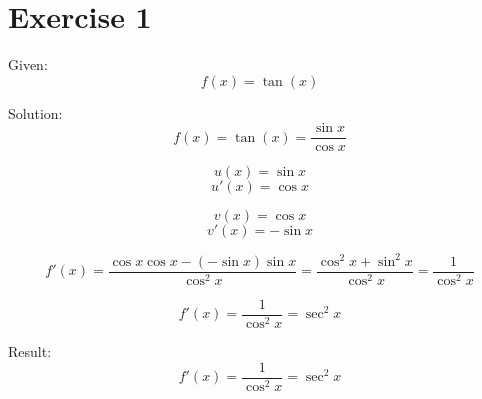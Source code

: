 \documentclass[a4paper, 10pt]{scrartcl}
\begin{document}
\section{Exercise 1}

Given:
\[f(x) = \tan(x)\]

Solution:
\[f(x) = \tan(x) = \frac{\sin{x}}{\cos{x}}\]

\[u(x) = \sin{x}\]
\[u'(x) = \cos{x}\]

\[v(x) = \cos{x}\]
\[v'(x) = -\sin{x}\]

\[f'(x) = \frac{\cos{x}\cos{x} - (-\sin{x})\sin{x}}{\cos^{2}{x}} =
         \frac{\cos^{2}{x} + \sin^{2}{x}}{\cos^{2}{x}} = \frac{1}{\cos^{2}{x}}\]

\[f'(x) = \frac{1}{\cos^{2}{x}} = \sec^{2}{x}\]


Result:
\[f'(x) = \frac{1}{\cos^{2}{x}} = \sec^{2}{x}\]
\end{document}
